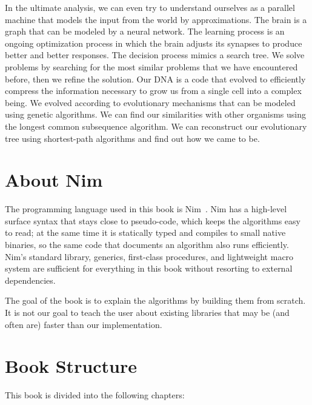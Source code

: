 \documentclass[justified, sixbynine]{tufte-book}
\theoremstyle{plain}%
\newtheorem * {corollary}{Corollary}
\theoremstyle{definition}
\theoremstyle{remark}
\newtheorem * {remark}{Remark}
\newtheorem * {note}{Note}
\begin{document}
\begin{fullwidth}
In the ultimate analysis, we can even try to understand ourselves as a parallel machine that models the input from the world by approximations. The brain is a graph that can be modeled by a neural network. The learning process is an ongoing optimization process in which the brain adjusts its synapses to produce better and better responses. The decision process mimics a search tree. We solve problems by searching for the most similar problems that we have encountered before, then we refine the solution. Our DNA is a code that evolved to efficiently compress the information necessary to grow us from a single cell into a complex being. We evolved according to evolutionary mechanisms that can be modeled using genetic algorithms. We can find our similarities with other organisms using the longest common subsequence algorithm. We can reconstruct our evolutionary tree using shortest-path algorithms and find out how we came to be.

\section{About Nim}

The programming language used in this book is Nim~\cite{nim}. Nim has a high-level surface syntax that stays close to pseudo-code, which keeps the algorithms easy to read; at the same time it is statically typed and compiles to small native binaries, so the same code that documents an algorithm also runs efficiently. Nim's standard library, generics, first-class procedures, and lightweight macro system are sufficient for everything in this book without resorting to external dependencies.

The goal of the book is to explain the algorithms by building them from scratch. It is not our goal to teach the user about existing libraries that may be (and often are) faster than our implementation.

\section{Book Structure}

This book is divided into the following chapters:


\end{fullwidth}
\end{document}
